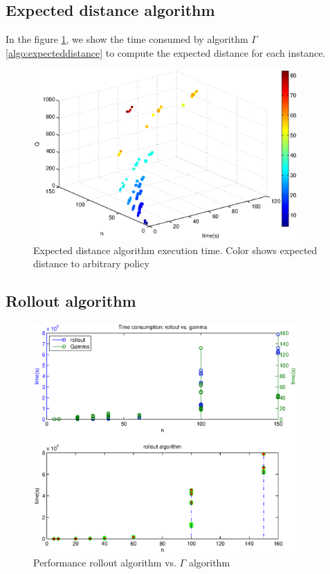 \subsection{Expected distance algorithm}\label{sec:test_expecteddistance}


In the figure \ref{fig:expected_distance3D_time}, we show the time consumed by algorithm $\Gamma$ \ref{algo:expecteddistance} to compute the expected distance for each instance.

\begin{figure}[!htbp]
  \begin{center}
   \includegraphics[width=0.9\textwidth]{Images/Chapter5/expected_distance3D.eps}
  \end{center}
    \caption{Expected distance algorithm execution time. Color shows expected distance to arbitrary policy }\label{fig:expected_distance3D_time}
\end{figure}


\subsection{Rollout algorithm}


\begin{figure}[!htbp]
  \begin{center}
   \includegraphics[width=0.9\textwidth]{Images/Chapter5/ra_gamma_time_x2.eps}
  \end{center}
    \caption{Performance rollout algorithm vs. $\Gamma$ algorithm}\label{fig:ra_gamma_time_x2}
\end{figure}

